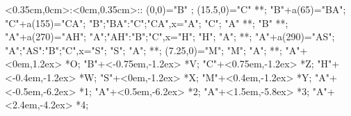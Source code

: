 %

\xy    <0.35cm,0cm>:<0cm,0.35cm>::
       (0,0)="B" ; (15.5,0)="C" **\dir{-}; 
       "B"+a(65)="BA"; "C"+a(155)="CA";
       {"B";"BA":"C";"CA",x}="A"; 
       "C"; "A" **\dir{-}; "B" **\dir{-};
       "A"+a(270)="AH"; {"A";"AH":"B";"C",x}="H";   "H"; "A"; **\dir{-};
       "A"+a(290)="AS"; {"A";"AS":"B";"C",x}="S";   "S"; "A"; **\dir{-};
       (7.25,0)="M";   "M"; "A"; **\dir{-};
	 "A"+<0em,1.2ex> *{O};
	 "B"+<-0.75em,-1.2ex> *{V};
	 "C"+<0.75em,-1.2ex> *{Z};
	 "H"+<-0.4em,-1.2ex> *{W};
	 "S"+<0em,-1.2ex> *{X};
	 "M"+<0.4em,-1.2ex> *{Y};
	 "A"+<-0.5em,-6.2ex> *{1};
	 "A"+<0.5em,-6.2ex> *{2};
	 "A"+<1.5em,-5.8ex> *{3};
	 "A"+<2.4em,-4.2ex> *{4};
       \endxy%
